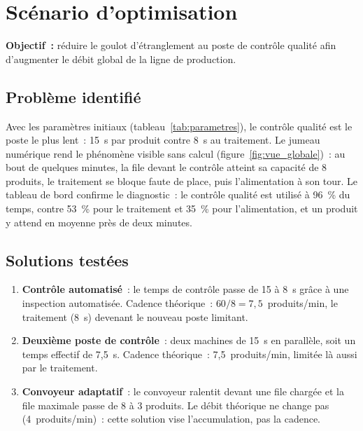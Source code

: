 \chapter{Scénario d'optimisation}
\label{chap:optimisation}

\begin{callout}
\textbf{Objectif~:} réduire le goulot d'étranglement au poste de contrôle qualité afin d'augmenter le débit global de la ligne de production.
\end{callout}

\section{Problème identifié}

Avec les paramètres initiaux (tableau~\ref{tab:parametres}), le contrôle qualité est le poste le plus lent~: 15~s par produit contre 8~s au traitement. Le jumeau numérique rend le phénomène visible sans calcul (figure~\ref{fig:vue_globale})~: au bout de quelques minutes, la file devant le contrôle atteint sa capacité de 8 produits, le traitement se bloque faute de place, puis l'alimentation à son tour. Le tableau de bord confirme le diagnostic~: le contrôle qualité est utilisé à 96~\% du temps, contre 53~\% pour le traitement et 35~\% pour l'alimentation, et un produit y attend en moyenne près de deux minutes.

\section{Solutions testées}

\begin{enumerate}
  \item \textbf{Contrôle automatisé}~: le temps de contrôle passe de 15 à 8~s grâce à une inspection automatisée. Cadence théorique~: $60/8 = 7{,}5$~produits/min, le traitement (8~s) devenant le nouveau poste limitant.
  \item \textbf{Deuxième poste de contrôle}~: deux machines de 15~s en parallèle, soit un temps effectif de 7{,}5~s. Cadence théorique~: 7{,}5~produits/min, limitée là aussi par le traitement.
  \item \textbf{Convoyeur adaptatif}~: le convoyeur ralentit devant une file chargée et la file maximale passe de 8 à 3 produits. Le débit théorique ne change pas (4~produits/min)~: cette solution vise l'accumulation, pas la cadence.
\end{enumerate}

